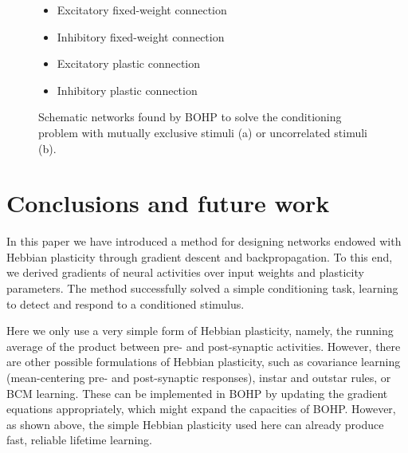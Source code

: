 \documentclass{article}
\begin{document}
\begin{figure}
\begin{subfigure}[t]{0.35\textwidth}
\end{subfigure}
\begin{minipage}[b]{0.35\textwidth}
\centering
\begin{itemize}
\item[]Excitatory fixed-weight connection
\item[]Inhibitory fixed-weight connection
\item[]Excitatory plastic connection
\item[]Inhibitory plastic connection
\end{itemize}
\end{minipage}
\caption{Schematic networks found by BOHP to solve the conditioning problem with
mutually exclusive stimuli (a) or uncorrelated stimuli (b).}
\label{fig:networks}
\end{figure}


\section{Conclusions and future work}


In this paper we have introduced a method for designing networks endowed with
Hebbian plasticity through gradient descent and backpropagation. To this end, we
derived gradients of neural activities over input weights and plasticity
parameters. The method successfully solved a simple conditioning task, learning
to detect and respond to a conditioned stimulus.

Here we only use a very simple form of Hebbian plasticity, namely, the
running average of the product between pre- and post-synaptic activities.
However, there are other possible formulations of Hebbian plasticity, such as
covariance learning (mean-centering pre- and post-synaptic responses), instar
and outstar rules, or BCM learning. These can be implemented in BOHP by updating
the gradient equations appropriately, which might expand the capacities of BOHP. However, as shown above, the simple
Hebbian plasticity used here can already produce fast, reliable lifetime
learning.
\end{document}
